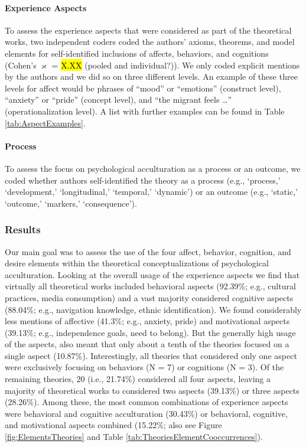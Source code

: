 \paragraph{Experience Aspects}

To assess the experience aspects that were considered as part of the
theoretical works, two independent coders coded the authors' axioms,
theorems, and model elements for self-identified inclusions of affects,
behaviors, and cognitions (Cohen's \(\varkappa\) = \hl{X.XX} (pooled and
individual?)). We only coded explicit mentions by the authors and we did
so on three different levels. An example of these three levels for
affect would be phrases of ``mood'' or ``emotions'' (construct level),
``anxiety'' or ``pride'' (concept level), and ``the migrant feels
\ldots{}'' (operationalization level). A list with further examples can
be found in Table \ref{tab:AspectExamples}.

\paragraph{Process}

To assess the focus on psychological acculturation as a process or an
outcome, we coded whether authors self-identified the theory as a
process (e.g., `process,' `development,' `longitudinal,' `temporal,'
`dynamic') or an outcome (e.g., `static,' `outcome,' `markers,'
`consequence').

\subsubsection{Results}

Our main goal was to assess the use of the four affect, behavior,
cognition, and desire elements within the theoretical conceptualizations
of psychological acculturation. Looking at the overall usage of the
experience aspects we find that virtually all theoretical works included
behavioral aspects (92.39\%; e.g., cultural practices, media
consumption) and a vast majority considered cognitive aspects (88.04\%;
e.g., navigation knowledge, ethnic identification). We found
considerably less mentions of affective (41.3\%; e.g., anxiety, pride)
and motivational aspects (39.13\%; e.g., independence goals, need to
belong). But the generally high usage of the aspects, also meant that
only about a tenth of the theories focused on a single aspect (10.87\%).
Interestingly, all theories that considered only one aspect were
exclusively focusing on behaviors (N = 7) or cognitions (N = 3). Of the
remaining theories, 20 (i.e., 21.74\%) considered all four aspects,
leaving a majority of theoretical works to considered two aspects
(39.13\%) or three aspects (28.26\%). Among these, the most common
combinations of experience aspects were behavioral and cognitive
acculturation (30.43\%) or behavioral, cognitive, and motivational
aspects combined (15.22\%; also see Figure \ref{fig:ElementsTheories}
and Table \ref{tab:TheoriesElementCooccurrences}).

